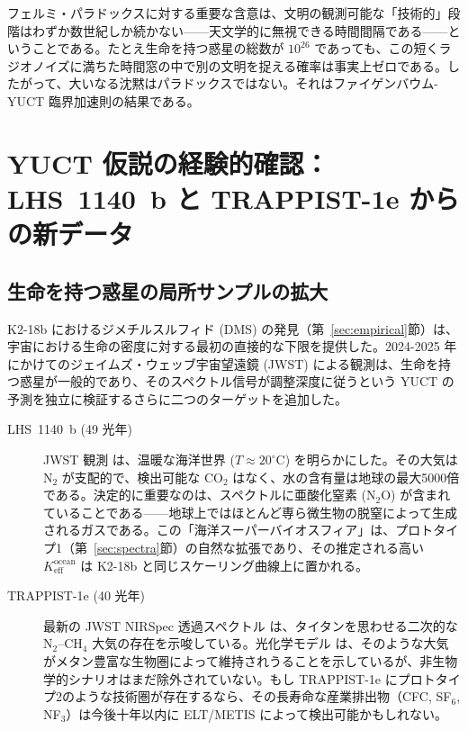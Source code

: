 \documentclass[11pt,a4paper]{article}
\begin{document}
	フェルミ・パラドックスに対する重要な含意は、文明の観測可能な「技術的」段階はわずか数世紀しか続かない——天文学的に無視できる時間間隔である——ということである。たとえ生命を持つ惑星の総数が \(10^{26}\) であっても、この短くラジオノイズに満ちた時間窓の中で別の文明を捉える確率は事実上ゼロである。したがって、大いなる沈黙はパラドックスではない。それはファイゲンバウム-YUCT 臨界加速則の結果である。
	
	\section{YUCT 仮説の経験的確認：LHS~1140~b と TRAPPIST-1e からの新データ}
	\label{sec:confirmation}
	
	\subsection{生命を持つ惑星の局所サンプルの拡大}
	K2-18b におけるジメチルスルフィド (DMS) の発見（第~\ref{sec:empirical}節）は、宇宙における生命の密度に対する最初の直接的な下限を提供した。2024-2025 年にかけてのジェイムズ・ウェッブ宇宙望遠鏡 (JWST) による観測は、生命を持つ惑星が一般的であり、そのスペクトル信号が調整深度に従うという YUCT の予測を独立に検証するさらに二つのターゲットを追加した。
	
	\begin{description}
		\item[LHS~1140~b (49 光年)] JWST 観測 \citep{Damiano2025} は、温暖な海洋世界 (\(T\approx 20^{\circ}\mathrm{C}\)) を明らかにした。その大気は N$_2$ が支配的で、検出可能な CO$_2$ はなく、水の含有量は地球の最大5000倍である。決定的に重要なのは、スペクトルに亜酸化窒素 (N$_2$O) が含まれていることである——地球上ではほとんど専ら微生物の脱窒によって生成されるガスである。この「海洋スーパーバイオスフィア」は、プロトタイプ1（第~\ref{sec:spectra}節）の自然な拡張であり、その推定される高い \(K_{\mathrm{eff}}^{\mathrm{ocean}}\) は K2-18b と同じスケーリング曲線上に置かれる。
		\item[TRAPPIST-1e (40 光年)] 最新の JWST NIRSpec 透過スペクトル \citep{Glidden2025} は、タイタンを思わせる二次的な N$_2$–CH$_4$ 大気の存在を示唆している。光化学モデル \citep{EagerNash2025} は、そのような大気がメタン豊富な生物圏によって維持されうることを示しているが、非生物学的シナリオはまだ除外されていない。もし TRAPPIST-1e にプロトタイプ2のような技術圏が存在するなら、その長寿命な産業排出物（CFC, SF$_6$, NF$_3$）は今後十年以内に ELT/METIS によって検出可能かもしれない。
	\end{description}
	
\end{document}
